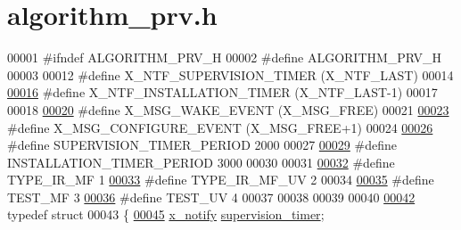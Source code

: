 \hypertarget{a00016_source}{\section{algorithm\+\_\+prv.\+h}
\label{a00016_source}
}

\begin{DoxyCode}
00001 \textcolor{preprocessor}{#ifndef ALGORITHM\_PRV\_H}
00002 \textcolor{preprocessor}{#define ALGORITHM\_PRV\_H}
00003 
00012 \textcolor{preprocessor}{#define X\_NTF\_SUPERVISION\_TIMER                (X\_NTF\_LAST)}
00014 
\hypertarget{a00016_source_l00016}{}\hyperlink{a00016_a3339ece3779a71354bcfaa90905b3a4a}{00016} \textcolor{preprocessor}{#define X\_NTF\_INSTALLATION\_TIMER               (X\_NTF\_LAST-1)}
00017 
00018 
\hypertarget{a00016_source_l00020}{}\hyperlink{a00016_ae6be514b1d949dc71420a3e549772995}{00020} \textcolor{preprocessor}{#define X\_MSG\_WAKE\_EVENT                       (X\_MSG\_FREE)}
00021 
\hypertarget{a00016_source_l00023}{}\hyperlink{a00016_a410c7d83b819fa283303a53830c87a96}{00023} \textcolor{preprocessor}{#define X\_MSG\_CONFIGURE\_EVENT                  (X\_MSG\_FREE+1)}
00024 
\hypertarget{a00016_source_l00026}{}\hyperlink{a00016_abc6f7a40b6aee60b122db32a0d82126c}{00026} \textcolor{preprocessor}{#define SUPERVISION\_TIMER\_PERIOD               2000}
00027 
\hypertarget{a00016_source_l00029}{}\hyperlink{a00016_a8c68dd8d7078113e9f088011171f492c}{00029} \textcolor{preprocessor}{#define INSTALLATION\_TIMER\_PERIOD              3000}
00030 
00031 
\hypertarget{a00016_source_l00032}{}\hyperlink{a00016_a78bbb321092eab3b988cf0c89bf0a572}{00032} \textcolor{preprocessor}{#define  TYPE\_IR\_MF                             1}
\hypertarget{a00016_source_l00033}{}\hyperlink{a00016_a88096870f430e03f71e1f390c67f09ce}{00033} \textcolor{preprocessor}{#define  TYPE\_IR\_MF\_UV                          2}
00034 
\hypertarget{a00016_source_l00035}{}\hyperlink{a00016_a73581885168dab0a1659db63d135b1cc}{00035} \textcolor{preprocessor}{#define  TEST\_MF                                3}
\hypertarget{a00016_source_l00036}{}\hyperlink{a00016_aa48458d081f4a50e025e7d67a92f31f5}{00036} \textcolor{preprocessor}{#define  TEST\_UV                                4}
00037 
00038 
00039 
00040 
\hypertarget{a00016_source_l00042}{}\hyperlink{a00016}{00042} \textcolor{keyword}{typedef} \textcolor{keyword}{struct}
00043 \{
\hypertarget{a00016_source_l00045}{}\hyperlink{a00016_af13eb2dcaed3eca6506489f8ad8fa768}{00045}     \hyperlink{a00036_df/d4c/a00851}{x\_notify}                         \hyperlink{a00016_af13eb2dcaed3eca6506489f8ad8fa768}{supervision\_timer};

\end{DoxyCode}
